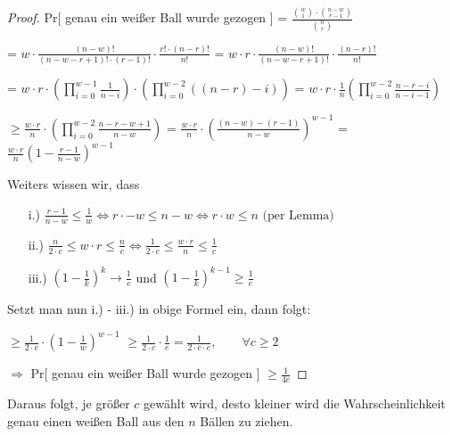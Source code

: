 \documentclass{article}
\begin{document}
\begin{proof}
  Pr[ genau ein wei{\ss}er Ball wurde gezogen ]
    = $\frac{\binom{w}{1} \cdot \binom{n - w}{r - 1}}{\binom{n}{r}}$

    = $w \cdot \frac{(n - w)!}{(n - w - r + 1)! \cdot (r - 1)!} \cdot \frac{r! \cdot (n - r)!}{n!}$
    = $w \cdot r \cdot \frac{(n - w)!}{(n - w - r + 1)!} \cdot \frac{(n - r)!}{n!}$

    = $w \cdot r \cdot \left( \prod\limits_{i = 0}^{w - 1} \frac{1}{n - i} \right) \cdot \left( \prod\limits_{i = 0}^{w - 2} \left( \left( n - r \right) - i \right) \right)$
    = $w \cdot r \cdot \frac{1}{n} \left( \prod\limits_{i = 0}^{w - 2} \frac{n - r - i}{n - i - 1} \right)$

    $\geq \frac{w \cdot r}{n} \cdot \left( \prod\limits_{i = 0}^{w - 2} \frac{n - r - w + 1}{n - w} \right)$
    = $\frac{w \cdot r}{n} \cdot \left( \frac{\left( n - w \right) - \left( r - 1 \right)}{n - w} \right)^{w - 1}$
    = $\frac{w \cdot r}{n} \left( 1 - \frac{r - 1}{n - w} \right)^{w - 1}$
   
  \bigskip
  \noindent
  Weiters wissen wir, dass
  \begin{enumerate}
    \item[i.)] $\frac{r - 1}{n - w} \leq \frac{1}{w}
        \Longleftrightarrow r \cdot  - w \leq n - w
        \Longleftrightarrow r \cdot w \leq n \text{ (per Lemma)}
      $
    \item[ii.)] $\frac{n}{2 \cdot c} \leq w \cdot r \leq \frac{n}{c}
        \Longleftrightarrow \frac{1}{2 \cdot c} \leq \frac{w \cdot r}{n} \leq \frac{1}{c}
      $
    \item[iii.)] $\left( 1 - \frac{1}{k} \right)^k \rightarrow \frac{1}{c}$ und
      $\left( 1 - \frac{1}{k} \right)^{k - 1} \geq \frac{1}{e}$
  \end{enumerate}

  \bigskip
  \noindent
  Setzt man nun i.) - iii.) in obige Formel ein, dann folgt:

  $\geq \frac{1}{2 \cdot c} \cdot \left( 1 - \frac{1}{w} \right)^{w - 1}$
  $\geq \frac{1}{2 \cdot c} \cdot \frac{1}{e} = \frac{1}{2 \cdot c \cdot e},
    \qquad \forall c \geq 2
  $

  $\Rightarrow$ Pr[ genau ein wei{\ss}er Ball wurde gezogen ] $\geq \frac{1}{4e}$
\end{proof}

\noindent
Daraus folgt, je gr{\"o}{\ss}er $c$ gew{\"a}hlt wird, desto kleiner wird die
Wahrscheinlichkeit genau einen wei{\ss}en Ball aus den $n$ B{\"a}llen zu ziehen.
\end{document}
